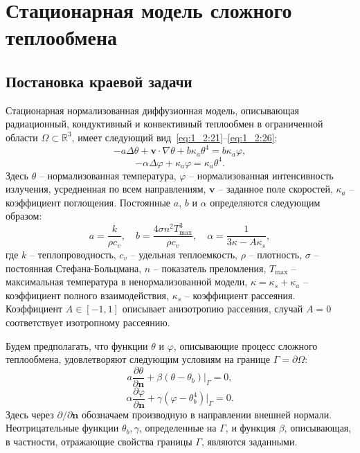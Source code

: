 \section{Стационарная модель сложного теплообмена}\label{sec:ch1/sec3}

\subsection{Постановка краевой задачи}
\label{subsec:ch1/sec3/state}

Стационарная нормализованная диффузионная модель, описывающая
радиационный, кондуктивный и конвективный теплообмен в
ограниченной области $\Omega \subset \mathbb{R}^3$,
имеет следующий вид~\eqref{eq:1_2:21}--\eqref{eq:1_2:26}:
\begin{equation}
    \label{eq:1_4:4-1}
    -a \Delta \theta + \textbf{v} \cdot \nabla \theta
    + b \kappa_a \theta^4 =  b \kappa_a \varphi,
\end{equation}
\begin{equation}
    \label{eq:1_4:4-2}
    - \alpha \Delta \varphi + \kappa_a \varphi = \kappa_a \theta^4.
\end{equation}
Здесь $\theta$ -- нормализованная температура, $\varphi$ --
нормализованная интенсивность излучения, усредненная по всем
направлениям, $\textbf{v}$ -- заданное поле скоростей, $\kappa_a$ --
коэффициент поглощения.
Постоянные $a$, $b$ и $\alpha$
определяются следующим образом:
\[
    a = \frac{k}{\rho c_v},\quad b = \frac{4\sigma n^2 T_{\max}^3}{\rho c_v},
    \quad \alpha=\frac{1}{3\kappa - A \kappa_s},
\]
где $k$ -- теплопроводность, $c_v$ -- удельная теплоемкость, $\rho$ --
плотность, $\sigma$ -- постоянная Стефана-Больцмана, $n$ --
показатель преломления, $T_{\max}$ -- максимальная температура в
ненормализованной модели, $\kappa = \kappa_s + \kappa_a$ -- коэффициент
полного взаимодействия, $\kappa_s$ -- коэффициент рассеяния.
Коэффициент $A \in [-1, 1]$ описывает анизотропию рассеяния, случай
$A=0$ соответствует изотропному рассеянию.

Будем предполагать, что функции $\theta$ и $\varphi$, описывающие
процесс сложного теплообмена, удовлетворяют следующим условиям на
границе $\Gamma = \partial \Omega$:
\begin{equation}
    \label{eq:1_4:4-3}
    a \frac{\partial \theta}{\partial \mathbf{n}}
    +\left.\beta\left(\theta-\theta_{b}\right)\right|_{\Gamma}=0,
\end{equation}
\begin{equation}
    \label{eq:1_4:4-4}
    \alpha \frac{\partial \varphi}{\partial \mathbf{n}} + \gamma
    (\varphi-\theta_b^4)|_{\Gamma} = 0.
\end{equation}
Здесь через $\partial/\partial \mathbf{n}$ обозначаем производную
в направлении внешней нормали.
Неотрицательные функции $\theta_{b}, \gamma$, определенные на $\Gamma$, и функция $\beta$,
описывающая, в частности, отражающие свойства границы $\Gamma$, являются заданными.

